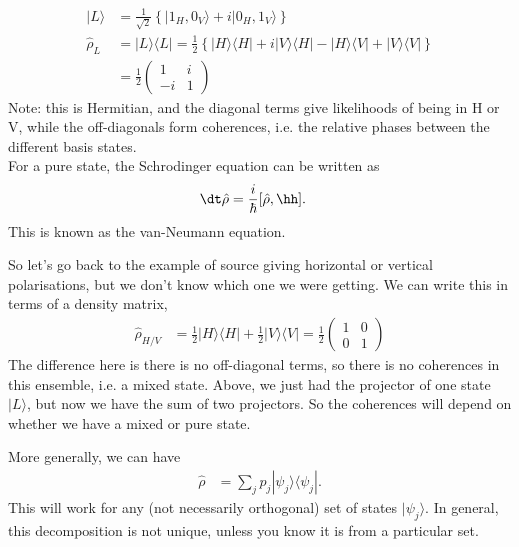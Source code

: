 \documentclass[a4paper, 11pt, normalem]{report}
\newcommand\hrho{\hat{\rho}}
\begin{document}
\begin{example}
    \begin{align}
        |L\rangle &= \frac{1}{\sqrt{2}}\left\{|1_H,0_V\rangle + i|0_H,1_V\rangle\right\} \\
        \hat{\rho}_L &= |L\rangle\langle L| = \frac12\left\{ |H\rangle\langle H| + i|V\rangle\langle H| - |H\rangle\langle V| + |V\rangle\langle V|\right\} \\
                  &= \frac12 \begin{pmatrix} 1 & i \\ -i & 1 \end{pmatrix}
    \end{align}
    Note: this is Hermitian, and the diagonal terms give likelihoods of being in H or V, while the off-diagonals form coherences, i.e. the relative phases between the different basis states.\\
    For a pure state, the Schrodinger equation can be written as
    \begin{align}
        \dt \hat{\rho} &= \frac{i}{\hbar}[\hat{\rho},\hh].
    \end{align}
    This is known as the van-Neumann equation.

    So let's go back to the example of source giving horizontal or vertical polarisations, but we don't know which one we were getting. 
    We can write this in terms of a density matrix,
    \begin{align}
        \hrho_{H/V} &= \frac12|H\rangle\langle H| + \frac12|V\rangle\langle V| = \frac12 \begin{pmatrix} 1 & 0 \\ 0 & 1 \end{pmatrix}
    \end{align}
    The difference here is there is no off-diagonal terms, so there is no coherences in this ensemble, i.e. a mixed state. 
    Above, we just had the projector of one state $|L\rangle$, but now we have the sum of two projectors. 
    So the coherences will depend on whether we have a mixed or pure state.
\end{example}

More generally, we can have
\begin{align}
    \hrho &= \sum_j p_j|\psi_j\rangle\langle\psi_j|.
\end{align}
This will work for any (not necessarily orthogonal) set of states $|\psi_j\rangle$.
In general, this decomposition is not unique, unless you know it is from a particular set. 
\end{document}
